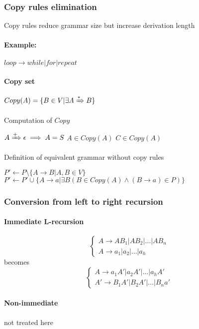 \documentclass{article}
\newcommand{\derives}[1][ ]{\xRightarrow{#1}}
\begin{document}
\subsubsection{Copy rules elimination} Copy rules reduce grammar size but increase derivation length
\paragraph{Example: }$loop \to while | for | repeat$
\paragraph{Copy set} $Copy(A)=\{B \in V | \exists A \derives[*]B\}$
\begin{algorithm}
\caption{Computation of $Copy$}
\begin{algorithmic}
\REQUIRE $A \derives[+] \epsilon \implies A=S$ 
\REPEAT
		\STATE $A \in Copy(A)$
				\STATE $C \in Copy(A)$
			\ENDIF
		\ENDFOR
	\ENDFOR
{}
\end{algorithmic}
\end{algorithm}
\begin{algorithm}
\caption{Definition of equivalent grammar without copy rules}
\begin{algorithmic}
\STATE $P' \leftarrow P \setminus \{A\to B|A,B \in V\}$ 
\STATE $P' \leftarrow P' \cup \{A\to a|\exists B(B \in Copy(A) \wedge (B\to a)\in P)\}$ 
\end{algorithmic}
\end{algorithm}
\subsubsection{Conversion from left to right recursion}
\paragraph{Immediate L-recursion}
\[
\begin{cases}
A\to AB_1|AB_2|\dots |AB_n\\
A\to a_1|a_2|\dots|a_h
\end{cases}
\]
becomes
\[
\begin{cases}
A\to a_1A'|a_2A'|\dots|a_hA'\\
A'\to B_1A'|B_2A'|\dots|B_na'
\end{cases}
\]
\paragraph{Non-immediate} not treated here
\end{document}
